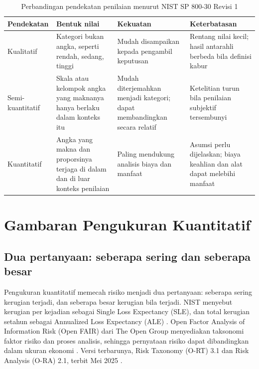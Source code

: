 \begin{table}[!htb]
  \centering\small
  \caption{Perbandingan pendekatan penilaian menurut NIST SP 800-30 Revisi 1}\label{tab:ch05-metode}
  \begin{tabularx}{\textwidth}{|>{\raggedright\arraybackslash}p{}|>{\raggedright\arraybackslash}X|>{\raggedright\arraybackslash}X|>{\raggedright\arraybackslash}X|}
    \hline
    \textbf{Pendekatan} & \textbf{Bentuk nilai} & \textbf{Kekuatan} & \textbf{Keterbatasan} \\ \hline
    Kualitatif & Kategori bukan angka, seperti rendah, sedang, tinggi & Mudah disampaikan kepada
    pengambil keputusan & Rentang nilai kecil; hasil antarahli berbeda bila definisi kabur \\ \hline
    Semi-kuantitatif & Skala atau kelompok angka yang maknanya hanya berlaku dalam konteks itu & Mudah
    diterjemahkan menjadi kategori; dapat membandingkan secara relatif & Ketelitian turun bila
    penilaian subjektif tersembunyi \\ \hline
    Kuantitatif & Angka yang makna dan proporsinya terjaga di dalam dan di luar konteks penilaian &
    Paling mendukung analisis biaya dan manfaat & Asumsi perlu dijelaskan; biaya keahlian dan alat
    dapat melebihi manfaat \\ \hline
  \end{tabularx}
\end{table}

\section{Gambaran Pengukuran Kuantitatif}

\subsection*{Dua pertanyaan: seberapa sering dan seberapa besar}

Pengukuran kuantitatif memecah risiko menjadi dua pertanyaan: seberapa sering kerugian terjadi, dan
seberapa besar kerugian bila terjadi. NIST menyebut kerugian per kejadian sebagai Single Loss
Expectancy (SLE), dan total kerugian setahun sebagai Annualized Loss Expectancy (ALE)
\cite{c05-nist-ir8286ar1}. Open Factor Analysis of Information Risk (Open FAIR) dari The Open Group
menyediakan taksonomi faktor risiko dan proses analisis, sehingga pernyataan risiko dapat dibandingkan
dalam ukuran ekonomi \cite{c05-openfair-bok}. Versi terbarunya, Risk Taxonomy (O-RT) 3.1 dan Risk
Analysis (O-RA) 2.1, terbit Mei 2025 \cite{c05-openfair-2025}.

